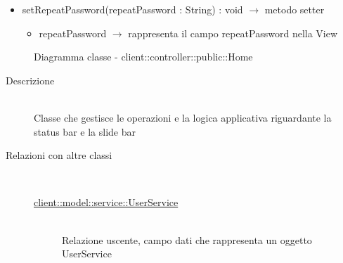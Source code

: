 \begin{description}
\begin{itemize}
	\item setRepeatPassword(repeatPassword : String) : void $\rightarrow$ metodo setter\begin{itemize}
		\item repeatPassword $\rightarrow$ rappresenta il campo repeatPassword nella View
	\end{itemize}
	
\end{itemize}

\end{description}

\vspace{0.5cm}
\hypertarget{client::controller::public::Home}{}
\begin{figure}[H]
	\centering
	\caption{Diagramma classe - client::controller::public::Home}
\end{figure}\begin{description}
\item[Descrizione] \hfill \\
Classe che gestisce le operazioni e la logica applicativa riguardante la status bar e la slide bar
\item[Relazioni con altre classi] \hfill \\
\vspace{-7mm}
\begin{description}
	\item[\hyperlink{client::model::service::UserService}{client::model::service::UserService}] \hfill \\
	Relazione uscente, campo dati che rappresenta un oggetto UserService
\end{description}


\end{description}

